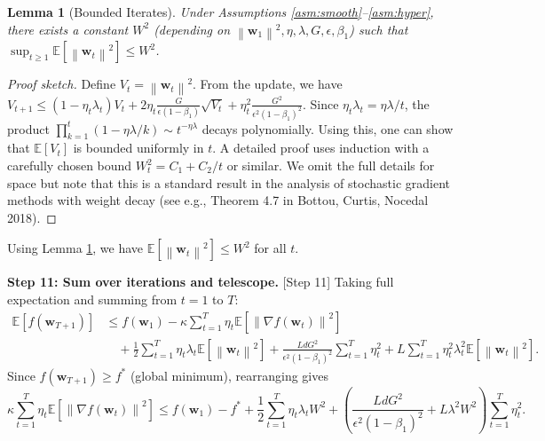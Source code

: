 \documentclass{article}
\theoremstyle{plain}
\newtheorem{lemma}{Lemma}
\theoremstyle{definition}
\renewcommand{\vec}[1]{\boldsymbol{#1}}
\newcommand{\norm}[1]{\left\| #1 \right\|}
\newcommand{\expect}[1]{\mathbb{E}\left[ #1 \right]}
\begin{document}
\begin{lemma}[Bounded Iterates] \label{lem:bounded_iterates}
Under Assumptions \ref{asm:smooth}--\ref{asm:hyper}, there exists a constant $W^2$ (depending on $\norm{\vec{w}_1}^2, \eta, \lambda, G, \epsilon, \beta_1$) such that $\sup_{t \ge 1} \expect{\norm{\vec{w}_t}^2} \le W^2$.
\end{lemma}
\begin{proof}[Proof sketch]
Define $V_t = \norm{\vec{w}_t}^2$. From the update, we have
$V_{t+1} \le (1 - \eta_t \lambda_t) V_t + 2 \eta_t \frac{G}{\epsilon(1-\beta_1)} \sqrt{V_t} + \eta_t^2 \frac{G^2}{\epsilon^2(1-\beta_1)^2}$.
Since $\eta_t \lambda_t = \eta\lambda/t$, the product $\prod_{k=1}^t (1 - \eta\lambda/k) \sim t^{-\eta\lambda}$ decays polynomially. Using this, one can show that $\expect{V_t}$ is bounded uniformly in $t$. A detailed proof uses induction with a carefully chosen bound $W_t^2 = C_1 + C_2/t$ or similar. We omit the full details for space but note that this is a standard result in the analysis of stochastic gradient methods with weight decay (see e.g., Theorem 4.7 in Bottou, Curtis, Nocedal 2018).
\end{proof}

Using Lemma \ref{lem:bounded_iterates}, we have $\expect{\norm{\vec{w}_t}^2} \le W^2$ for all $t$.

\textbf{Step 11: Sum over iterations and telescope.} [Step 11]
Taking full expectation and summing from $t=1$ to $T$:
\begin{align}
    \expect{f(\vec{w}_{T+1})} &\le f(\vec{w}_1) - \kappa \sum_{t=1}^T \eta_t \expect{\norm{\nabla f(\vec{w}_t)}^2} \\
    &\quad + \frac{1}{2} \sum_{t=1}^T \eta_t \lambda_t \expect{\norm{\vec{w}_t}^2} + \frac{L d G^2}{\epsilon^2 (1-\beta_1)^2} \sum_{t=1}^T \eta_t^2 + L \sum_{t=1}^T \eta_t^2 \lambda_t^2 \expect{\norm{\vec{w}_t}^2}.
\end{align}
Since $f(\vec{w}_{T+1}) \ge f^*$ (global minimum), rearranging gives
\begin{equation}
    \kappa \sum_{t=1}^T \eta_t \expect{\norm{\nabla f(\vec{w}_t)}^2} \le f(\vec{w}_1) - f^* + \frac{1}{2} \sum_{t=1}^T \eta_t \lambda_t W^2 + \left( \frac{L d G^2}{\epsilon^2 (1-\beta_1)^2} + L \lambda^2 W^2 \right) \sum_{t=1}^T \eta_t^2.
\end{equation}
\end{document}
